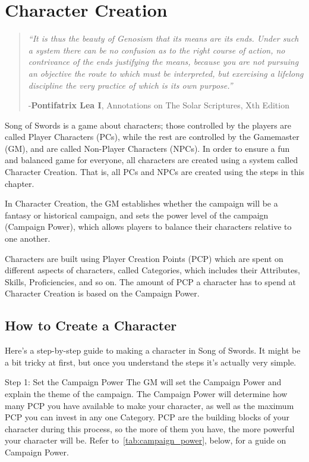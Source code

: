 \documentclass[oneside,11pt,english]{book}
\begin{document}
\chapter{Character Creation}\label{ch:charcreation}
\startcontents[chapters]
\newpage
	\begin{quote}
		\emph{“It is thus the beauty of Genosism that its means are its ends. Under such a system there can be no confusion as to the right course of action, no contrivance of the ends justifying the means, because you are not pursuing an objective the route to which must be interpreted, but exercising a lifelong discipline the very practice of which is its own purpose.”}\par

		\hfill -\textbf{Pontifatrix Lea I}, Annotations on The Solar Scriptures, Xth Edition 
	\end{quote} 
Song of Swords is a game about characters; those controlled by the players are called Player Characters 
(PCs), while the rest are controlled by the Gamemaster (GM), and are called Non-Player Characters 
(NPCs). In order to ensure a fun and balanced game for everyone, all characters are created using a 
system called Character Creation. That is, all PCs and NPCs are created using the steps in this chapter. 

 
In Character Creation, the GM establishes whether the campaign will be a fantasy or historical campaign, 
and sets the power level of the campaign (Campaign Power), which allows players to balance their 
characters relative to one another. 

 
Characters are built using Player Creation Points (PCP) which are spent on different aspects of characters, 
called Categories, which includes their Attributes, Skills, Proficiencies, and so on. The amount of PCP a 
character has to spend at Character Creation is based on the Campaign Power. 

 
\section{How to Create a Character}
Here’s a step-by-step guide to making a character in Song of Swords. It might be a bit tricky at first, but 
once you understand the steps it’s actually very simple. 

Step 1: Set the Campaign Power 
The GM will set the Campaign Power and explain the theme of the campaign. The Campaign Power will 
determine how many PCP you have available to make your character, as well as the maximum PCP you 
can invest in any one Category. PCP are the building blocks of your character during this process, so the 
more of them you have, the more powerful your character will be. Refer to~\autoref{tab:campaign_power}, below, for a guide 
on Campaign Power. 
 
\end{document}
